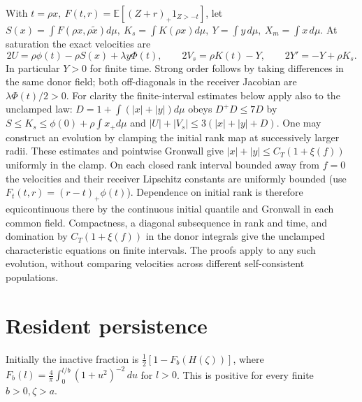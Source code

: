 \documentclass[11pt]{article}
\newcommand{\dd}{\,d}\newcommand{\E}{\mathbb E}
\begin{document}
With \(t=\rho x,\ F(t,r)=\E[(Z+r)_+1_{Z>-t}]\), let
\(S(x)=\int F(\rho x,\rho\tilde x)d\mu,\ K_s=\int K(\rho x)d\mu,\
Y=\int y\,d\mu,\ X_m=\int x\,d\mu\).
At saturation the exact velocities are
\[
 2U=\rho\phi(t)-\rho S(x)+\lambda y\Phi(t),\qquad
 2V_s=\rho K(t)-Y,\qquad 2Y'=-Y+\rho K_s.
\]
In particular \(Y>0\) for finite time. Strong order follows by taking
differences in the same donor field; both off-diagonals in the
receiver Jacobian are \(\lambda\Phi(t)/2>0\).
For clarity the finite-interval estimates below apply also to the
unclamped law: \(D=1+\int(|x|+|y|)d\mu\) obeys \(D^+D\le7D\)
by \(S\le K_s\le\phi(0)+\rho\int x_+d\mu\) and
\(|U|+|V_s|\le3(|x|+|y|+D)\).
One may construct an evolution by clamping the initial rank map at
successively larger radii. These estimates and pointwise Gronwall give
\(|x|+|y|\le C_T(1+\xi(f))\) uniformly in the clamp. On each closed
rank interval bounded away from \(f=0\) the velocities and their receiver
Lipschitz constants are uniformly bounded (use
\(F_t(t,r)=(r-t)_+\phi(t)\)). Dependence on initial rank is therefore
equicontinuous there by the continuous initial quantile and Gronwall in
each common field. Compactness, a diagonal subsequence in rank and time,
and domination by \(C_T(1+\xi(f))\) in the donor integrals give the
unclamped characteristic equations on finite intervals. The proofs
apply to any such evolution, without comparing velocities across
different self-consistent populations.

\section{Resident persistence}\label{an04impv1:resident}
Initially the inactive fraction is
\(\tfrac12[1-F_b(H(\zeta))]\), where
\(F_b(l)=\frac4\pi\int_0^{l/b}(1+u^2)^{-2}\dd u\) for \(l>0\).
This is positive for every finite \(b>0,\zeta>a\).
\end{document}
